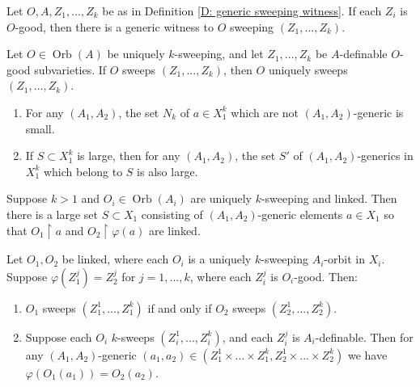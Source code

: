 \documentclass[10pt,a4paper]{amsart}
\begin{document}
\begin{lemma}\label{L: generic sweeping witness}
   Let $O,A,Z_1,...,Z_k$ be as in Definition \ref{D: generic sweeping witness}. If each $Z_i$ is $O$-good, then there is a generic witness to $O$ sweeping $(Z_1,...,Z_k)$.
\end{lemma}

\begin{lemma}\label{L: relativized sweeping is unique}
    Let $O\in\operatorname{Orb}(A)$ be uniquely $k$-sweeping, and let $Z_1,...,Z_k$ be $A$-definable $O$-good subvarieties. If $O$ sweeps $(Z_1,...,Z_k)$, then $O$ uniquely sweeps $(Z_1,...,Z_k)$.
\end{lemma}

\begin{corollary}\label{C: non-generics are small}
    \begin{enumerate}
        \item For any $(A_1,A_2)$, the set $N_k$ of $a\in X_1^k$ which are not $(A_1,A_2)$-generic is small.
        \item If $S\subset X_1^k$ is large, then for any $(A_1,A_2)$, the set $S'$ of $(A_1,A_2)$-generics in $X_1^k$ which belong to $S$ is also large.
    \end{enumerate}
\end{corollary}

\begin{lemma}\label{L: linked restriction}
    Suppose $k>1$ and $O_i\in\operatorname{Orb}(A_i)$ are uniquely $k$-sweeping and linked. Then there is a large set $S\subset X_1$ consisting of $(A_1,A_2)$-generic elements $a\in X_1$ so that $O_1\restriction a$ and $O_2\restriction\varphi(a)$ are linked. 
\end{lemma}

\begin{theorem}[= Theorem \ref{T: intro link preservation}]\label{T: preservation}
    Let $O_1,O_2$ be linked, where each $O_i$ is a uniquely $k$-sweeping $A_i$-orbit in $X_i$. Suppose $\varphi(Z_1^j)=Z_2^j$ for $j=1,...,k$, where each $Z_i^j$ is $O_i$-good. Then:
    \begin{enumerate}
        \item $O_1$ sweeps $(Z_1^1,...,Z_1^k)$ if and only if $O_2$ sweeps $(Z_2^1,...,Z_2^k)$.
        \item Suppose each $O_i$ $k$-sweeps $(Z_i^1,...,Z_i^k)$, and each $Z_i^j$ is $A_i$-definable. Then for any $(A_1,A_2)$-generic $(a_1,a_2)\in(Z_1^1\times...\times Z_1^k,Z_2^1\times...\times Z_2^k)$ we have $\varphi(O_1(a_1))=O_2(a_2)$.
    \end{enumerate}
\end{theorem}
\end{document}
